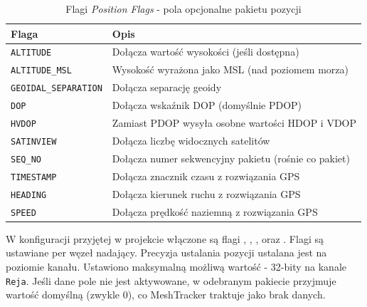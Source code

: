 \begin{table}[!h]
    \caption{Flagi \textit{Position Flags} - pola opcjonalne pakietu pozycji}
    \label{tab:position-flags}
    \centering
    \begin{tabular}{|l|p{9cm}|}
        \hline
        \textbf{Flaga} & \textbf{Opis} \\
        \hline
        \texttt{ALTITUDE}           & Dołącza wartość wysokości (jeśli dostępna) \\
        \texttt{ALTITUDE\_MSL}      & Wysokość wyrażona jako MSL (nad poziomem morza) \\
        \texttt{GEOIDAL\_SEPARATION}& Dołącza separację geoidy\footnotemark \\
        \texttt{DOP}                & Dołącza wskaźnik DOP (domyślnie PDOP)\footnotemark{} \\
        \texttt{HVDOP}              & Zamiast PDOP wysyła osobne wartości HDOP i VDOP\footnotemark \\
        \texttt{SATINVIEW}          & Dołącza liczbę widocznych satelitów \\
        \texttt{SEQ\_NO}            & Dołącza numer sekwencyjny pakietu (rośnie co pakiet) \\
        \texttt{TIMESTAMP}          & Dołącza znacznik czasu z rozwiązania GPS \\
        \texttt{HEADING}            & Dołącza kierunek ruchu z rozwiązania GPS \\
        \texttt{SPEED}              & Dołącza prędkość naziemną z rozwiązania GPS \\
        \hline
    \end{tabular}
\end{table}
\addtocounter{footnote}{-2}
\addtocounter{footnote}{1}
\addtocounter{footnote}{1}

W konfiguracji przyjętej w projekcie włączone są flagi \texttt{}, \texttt{},
\texttt{}, \texttt{} oraz \texttt{}. Flagi są ustawiane per węzeł nadający.
Precyzja ustalania pozycji ustalana jest na poziomie kanału. Ustawiono maksymalną możliwą
wartość - 32-bity na kanale \texttt{Reja}. Jeśli dane pole nie jest aktywowane, w odebranym
pakiecie przyjmuje wartość domyślną (zwykle 0), co MeshTracker traktuje jako brak danych. 


